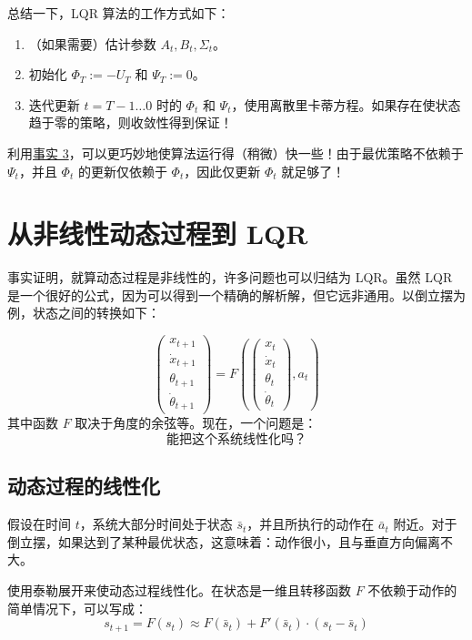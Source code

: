 总结一下，LQR 算法的工作方式如下：
\begin{enumerate}
    \item （如果需要）估计参数 $A_t, B_t, \Sigma_t$。
    \item 初始化 $\Phi_T := -U_T$ 和 $\Psi_T := 0$。
    \item 迭代更新 $t = T-1 \dots 0$ 时的 $\Phi_t$ 和 $\Psi_t$，使用离散里卡蒂方程。如果存在使状态趋于零的策略，则收敛性得到保证！
\end{enumerate}

利用\underline{事实 3}，可以更巧妙地使算法运行得（稍微）快一些！由于最优策略不依赖于 $\Psi_t$，并且 $\Phi_t$ 的更新仅依赖于 $\Phi_t$，因此仅更新 $\Phi_t$ 就足够了！

\section{从非线性动态过程到 LQR}

事实证明，就算动态过程是非线性的，许多问题也可以归结为 LQR。虽然 LQR 是一个很好的公式，因为可以得到一个精确的解析解，但它远非通用。以倒立摆为例，状态之间的转换如下：

\[
    \begin{pmatrix}
        x_{t+1} \\
        \dot{x}_{t+1} \\
        \theta_{t+1} \\
        \dot{\theta}_{t+1}
    \end{pmatrix}
    = F \left(
    \begin{pmatrix}
        x_t \\
        \dot{x}_t \\
        \theta_t \\
        \dot{\theta}_t
    \end{pmatrix}, a_t \right)
\]
其中函数 $F$ 取决于角度的余弦等。现在，一个问题是：
\[
    \textit{能把这个系统线性化吗？}
\]

\subsection{动态过程的线性化}

假设在时间 $t$，系统大部分时间处于状态 $\bar{s}_t$，并且所执行的动作在 $\bar{a}_t$ 附近。对于倒立摆，如果达到了某种最优状态，这意味着：动作很小，且与垂直方向偏离不大。

使用泰勒展开来使动态过程线性化。在状态是一维且转移函数 $F$ 不依赖于动作的简单情况下，可以写成：
\[
    s_{t+1} = F(s_t) \approx F(\bar{s}_t) + F'(\bar{s}_t) \cdot (s_t - \bar{s}_t)
\]

